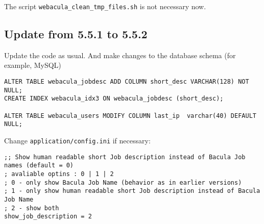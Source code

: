 \documentclass[10pt]{article}
\begin{document}
The script \texttt{webacula\_clean\_tmp\_files.sh} is not necessary now.

\subsection{Update from 5.5.1 to 5.5.2}
\label{Update: from 5.5.1 to 5.5.2}

Update the code as usual.
And make changes to the database schema (for example, MySQL)

\begin{verbatim}
ALTER TABLE webacula_jobdesc ADD COLUMN short_desc VARCHAR(128) NOT NULL;
CREATE INDEX webacula_idx3 ON webacula_jobdesc (short_desc);

ALTER TABLE webacula_users MODIFY COLUMN last_ip  varchar(40) DEFAULT NULL;
\end{verbatim}

Change \texttt{application/config.ini} if necessary:

\begin{verbatim}
;; Show human readable short Job description instead of Bacula Job names (default = 0)
; avaliable optins : 0 | 1 | 2
; 0 - only show Bacula Job Name (behavior as in earlier versions)
; 1 - only show human readable short Job description instead of Bacula Job Name
; 2 - show both
show_job_description = 2
\end{verbatim}
\end{document}
